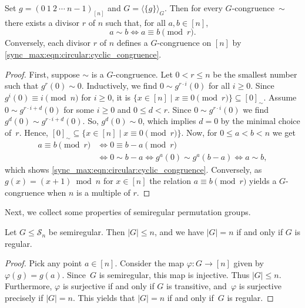 \begin{lemma}
	\label{lem:congruence_on_cyclic_group}
	Set $g = (0 ~ 1 ~ 2 ~ \cdots ~ n - 1)_{[n]}$ and $G = \langle \{ g \} \rangle_G$. Then for every $G$-congruence~$\sim$
	there exists a divisor $r$ of $n$ such that,  for all $a,b \in [n]$,
	\begin{equation}\label{sync_max:eqn:circular:cyclic_congruence}
		a \sim b \Leftrightarrow a \equiv b \pmod{r}.
	\end{equation}
	Conversely, each divisor $r$ of $n$ defines a $G$-congruence on $[n]$
	by \cref{sync_max:eqn:circular:cyclic_congruence}.
\end{lemma}
\begin{proof} %
	First, suppose $\sim$ is a $G$-congruence.
	Let $0 < r \le n$ be the smallest number such that $g^r(0) \sim 0$.
	Inductively, we find $0 \sim g^{r \cdot i}(0)$ for all $i \ge 0$.
	Since $g^{i}(0) \equiv i \pmod{n}$ for $i \ge 0$,
	it is $\{ x \in [n] \mid x \equiv 0 \pmod{r} \} \subseteq [0]_{\sim}$.
	Assume $0 \sim g^{r \cdot i + d}(0)$ for some $i \ge 0$ and $0 \le d < r$.
	Since $0 \sim g^{r \cdot i}(0)$ we find $g^d(0) \sim g^{r\cdot i + d}(0)$.
	So, $g^{d}(0) \sim 0$, which implies $d = 0$ by
	the minimal choice of~$r$.
	Hence, $[0]_{\sim} \subseteq \{ x \in [n] \mid x \equiv 0 \pmod{r} \}$.
	Now, for $0 \le a < b < n$ we get
	\begin{align*}
		a \equiv b \pmod{r} 
		& \Leftrightarrow 0 \equiv b - a \pmod{r} \\
		& \Leftrightarrow 0 \sim b - a 
		\Leftrightarrow g^a(0) \sim g^a(b - a) 
		\Leftrightarrow a \sim b,		
	\end{align*}
    which shows \cref{sync_max:eqn:circular:cyclic_congruence}.
	Conversely, as $g(x) = ( x + 1 ) \bmod{n}$ for $x \in [n]$
    the relation $a \equiv b \pmod{r}$ yields a $G$-congruence when $n$ is a multiple of $r$. 	
\end{proof}

Next, we collect some properties of semiregular permutation groups.

\begin{proposition} \label{prelim:groups:prop:semiregular-size}
	Let $G \le \mathcal S_n$ be semiregular.
	Then $|G| \le n$, and we have $|G| = n$ if and only if $G$ is regular.
\end{proposition}
\begin{proof}
	Pick any point $a \in [n]$.
	Consider the map $\varphi \colon G \to [n]$
	given by $\varphi(g) = g(a)$.
	Since~$G$ is semiregular, this map is injective.
	Thus $|G| \le n$.
	Furthermore, $\varphi$ is surjective
	if and only if $G$ is transitive,
	and~$\varphi$ is surjective precisely if $|G| = n$.
	This yields that $|G| = n$ if and only if~$G$ is
	regular.
\end{proof}

